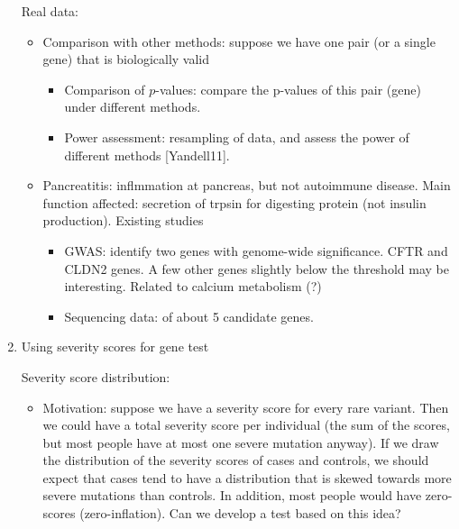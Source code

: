 \documentclass[11pt]{article}
\begin{document}
\begin{enumerate}
Real data:
\begin{itemize}
\item Comparison with other methods: suppose we have one pair (or a single gene) that is biologically valid
\begin{itemize}
\item Comparison of $p$-values: compare the p-values of this pair (gene) under different methods. 
\item Power assessment: resampling of data, and assess the power of different methods [Yandell11]. 
\end{itemize}

\item Pancreatitis: inflmmation at pancreas, but not autoimmune disease. Main function affected: secretion of trpsin for digesting protein (not insulin production). Existing studies
\begin{itemize}
	\item GWAS: identify two genes with genome-wide significance. CFTR and CLDN2 genes. A few other genes slightly below the threshold may be interesting. Related to calcium metabolism (?)
	\item Sequencing data: of about 5 candidate genes. 
\end{itemize}
\end{itemize}
 
\item{Using severity scores for gene test}

Severity score distribution: 
\begin{itemize}
\item Motivation: suppose we have a severity score for every rare variant. Then we could have a total severity score per individual (the sum of the scores, but most people have at most one severe mutation anyway). If we draw the distribution of the severity scores of cases and controls, we should expect that cases tend to have a distribution that is skewed towards more severe mutations than controls. In addition, most people would have zero-scores (zero-inflation). Can we develop a test based on this idea? 


\end{itemize}
\end{enumerate}
\end{document}
